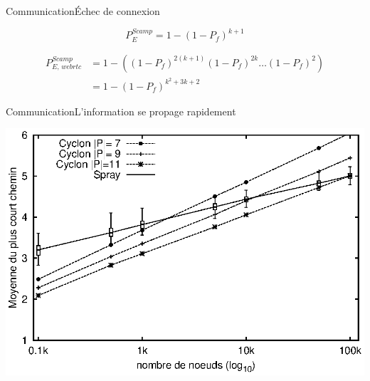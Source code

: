 \begin{frame}{Communication}{Échec de connexion}

  \begin{center}
    
  \end{center}

  \vspace{1cm}

  \begin{equation} P_{E}^{Scamp}=1-(1- P_f)^{k+1} \end{equation}

  \vspace{0.5cm}

  \begin{align} P_{E,\,webrtc}^{Scamp} &=1 - ((1-P_f)^{2(k+1)} (1-P_f)^{2k}
                                         \ldots (1-P_f)^2) \nonumber \\
                                       &=1-(1-P_f)^{k^2+3k+2}
  \end{align}
  
\end{frame}

\begin{frame}{Communication}{L'information se propage rapidement}
  \begin{center}
    \includegraphics[width=1\textwidth]{img/network/avgpath.eps}
  \end{center}
\end{frame}

